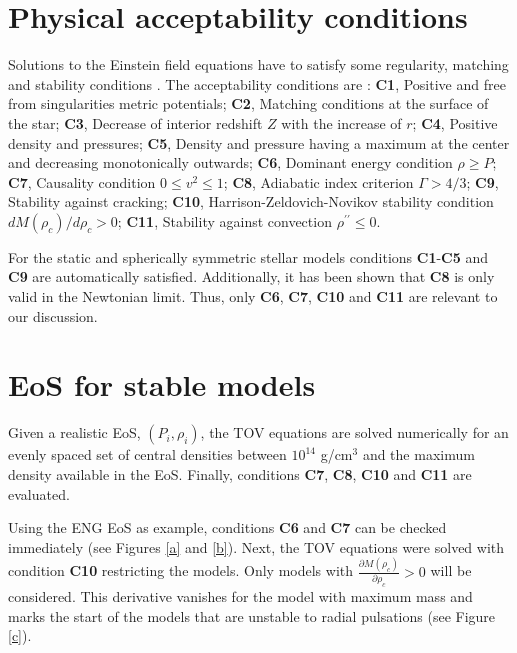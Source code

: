 \documentclass[a4paper]{jpconf} %
\begin{document}
\section{Physical acceptability conditions}\label{conditions}
Solutions to the Einstein field equations have to satisfy some regularity, matching and stability conditions \cite{DelgatyLake1998}. The acceptability conditions are  \cite{Ivanov2017, HernandezNunezVasquez2018, HernandezNunezSuarez2020}: {\bf C1}, Positive and free from singularities metric potentials; {\bf C2}, Matching conditions at the surface of the star; {\bf C3}, Decrease of interior redshift $Z$ with the increase of $r$; {\bf C4}, Positive density and pressures; {\bf C5}, Density and pressure having a maximum at the center and decreasing monotonically outwards; {\bf C6}, Dominant energy condition $\rho \geq P$; {\bf C7}, Causality condition $0\leq v^2 \leq 1$; {\bf C8}, Adiabatic index criterion $\Gamma > 4/3$; {\bf C9}, Stability against cracking; {\bf C10}, Harrison-Zeldovich-Novikov stability condition $dM(\rho_c)/d\rho_c>0$; {\bf C11}, Stability against convection $\rho^{\prime\prime} \leq 0$.

For the static and spherically symmetric stellar models conditions {\bf C1}-{\bf C5} and {\bf C9} are automatically satisfied. Additionally, it has been shown  \cite{Moustakidis2017} that {\bf C8} is only valid in the Newtonian limit. Thus, only {\bf C6}, {\bf C7}, {\bf C10} and {\bf C11} are relevant to our discussion. 

\section{EoS for stable models}
\label{methods}
Given a realistic EoS, $(P_i,\rho_i)$, the TOV equations are solved numerically for an evenly spaced set of central densities between $10^{14}$ g/cm$^3$ and the maximum density available in the EoS. Finally, conditions {\bf C7}, {\bf C8}, {\bf C10} and {\bf C11} are evaluated.

Using the ENG EoS \cite{EngvikEtal1994} as example, conditions {\bf C6} and {\bf C7} can be checked immediately (see Figures \ref{a} and \ref{b}). Next, the TOV equations were solved with condition {\bf C10} restricting the models. Only models with $\frac { \partial M \left( \rho _ { c } \right) } { \partial \rho _ { c } } > 0$ will be considered. This derivative vanishes for the model with maximum mass and marks the start of the models that are unstable to radial pulsations (see Figure \ref{c}). 
\end{document}
